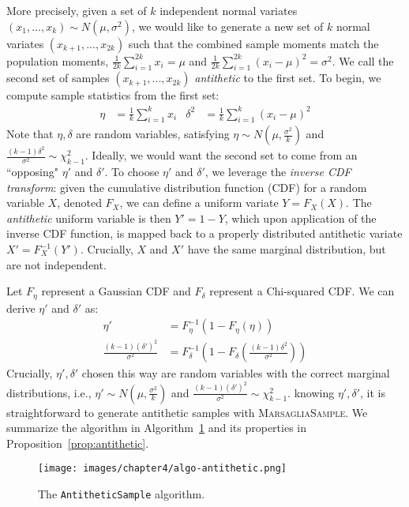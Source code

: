 More precisely, given a set of $k$ independent normal variates $(x_1, ..., x_k) \sim N(\mu, \sigma^2)$, we would like to generate a new set of $k$ normal variates $(x_{k+1}, ..., x_{2k})$ such that the combined sample moments match the population moments, $\frac{1}{2k}\sum_{i=1}^{2k} x_i = \mu$ and $\frac{1}{2k}\sum_{i=1}^{2k} (x_i -\mu)^2 = \sigma^2$. We call the second set of samples $(x_{k+1}, ..., x_{2k})$ \textit{antithetic} to the first set. To begin, we compute sample statistics from the first set:
\begin{align}
    \eta &= \frac{1}{k}\sum_{i=1}^{k} x_i & \delta^2 &= \frac{1}{k}\sum_{i=1}^{k} (x_i -\mu)^2
    \label{eqn:sample_stats}
\end{align}
Note that  $\eta,\delta$ are random variables, satisfying $\eta \sim N(\mu, \frac{\sigma^2}{k})$ and $\frac{(k-1)\delta^2}{\sigma^2} \sim \chi^2_{k-1}$. Ideally, we would want the second set to come from an ``opposing" $\eta'$ and $\delta'$. To choose $\eta'$ and $\delta'$, we leverage the \textit{inverse CDF transform}: given the cumulative distribution function (CDF) for a random variable $X$, denoted $F_X$, we can define a uniform variate $Y= F_X(X)$. The \textit{antithetic} uniform variable is then $Y' = 1 - Y$, which upon application of the inverse CDF function, is mapped back to a properly distributed antithetic variate $X' = F^{-1}_X(Y')$. Crucially, $X$ and $X'$ have the same marginal distribution, but are not independent.

Let $F_{\eta}$ represent a Gaussian CDF and $F_{\delta}$ represent a Chi-squared CDF. We can derive $\eta'$ and $\delta'$ as:
\begin{align}
    \eta' &= F^{-1}_\eta(1 - F_\eta(\eta)) \\
    \frac{(k-1)(\delta')^2}{\sigma^2} &= F^{-1}_\delta\left(1 - F_\delta \left(\frac{(k-1)\delta^2}{\sigma^2}\right)\right) \label{eq:inversechi}
\end{align}
Crucially, $\eta', \delta'$ chosen this way are random variables with the correct marginal distributions, i.e., $\eta' \sim N(\mu, \frac{\sigma^2}{k})$ and $\frac{(k-1)(\delta')^2}{\sigma^2} \sim \chi^2_{k-1}$. knowing $\eta', \delta'$, it is straightforward to generate antithetic samples with \textsc{MarsagliaSample}. We summarize the algorithm in Algorithm~\ref{alg:antithetic} and its properties in Proposition~\ref{prop:antithetic}.

\begin{figure}
    \centering
    \texttt{[image: images/chapter4/algo-antithetic.png]}
    \caption{The \texttt{AntitheticSample} algorithm.}
    \label{alg:antithetic}
\end{figure}

